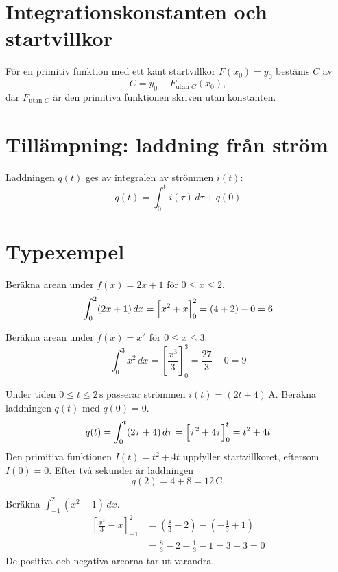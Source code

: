 \section{Integrationskonstanten och startvillkor}
\label{c14:sec:startvillkor}
För en primitiv funktion med ett känt startvillkor $F(x_0) = y_0$ bestäms $C$ av
\[
  C = y_0 - F_{\text{utan }C}(x_0),
\]
där $F_{\text{utan }C}$ är den primitiva funktionen skriven utan konstanten.

\section{Tillämpning: laddning från ström}
\label{c14:sec:laddning}
Laddningen $q(t)$ ges av integralen av strömmen $i(t)$:
\[
  q(t) = \int_0^t i(\tau)\,d\tau + q(0)
\]

\section{Typexempel}
\label{c14:sec:typexempel}

\begin{exempel}
Beräkna arean under $f(x) = 2x + 1$ för $0 \leq x \leq 2$.
\[
  \int_0^2 (2x + 1)\,dx = \Bigl[x^2 + x\Bigr]_0^2 = (4 + 2) - 0 = 6
\]
\end{exempel}

\begin{exempel}
Beräkna arean under $f(x) = x^2$ för $0 \leq x \leq 3$.
\[
  \int_0^3 x^2\,dx = \left[\frac{x^3}{3}\right]_0^3 = \frac{27}{3} - 0 = 9
\]
\end{exempel}

\begin{exempel}
Under tiden $0 \leq t \leq 2\,\text{s}$ passerar strömmen $i(t) = (2t + 4)\,\text{A}$. Beräkna
laddningen $q(t)$ med $q(0) = 0$.
\[
  q(t) = \int_0^t (2\tau + 4)\,d\tau = \Bigl[\tau^2 + 4\tau\Bigr]_0^t = t^2 + 4t
\]
Den primitiva funktionen $I(t) = t^2 + 4t$ uppfyller startvillkoret, eftersom $I(0) = 0$. Efter
två sekunder är laddningen
\[
  q(2) = 4 + 8 = 12\,\text{C}.
\]
\end{exempel}

\begin{exempel}
Beräkna $\displaystyle\int_{-1}^{2} (x^2 - 1)\,dx$.
\begin{align*}
  \left[\frac{x^3}{3} - x\right]_{-1}^{2}
    &= \left(\frac{8}{3} - 2\right) - \left(-\frac{1}{3} + 1\right) \\
    &= \frac{8}{3} - 2 + \frac{1}{3} - 1 = 3 - 3 = 0
\end{align*}
De positiva och negativa areorna tar ut varandra.
\end{exempel}
